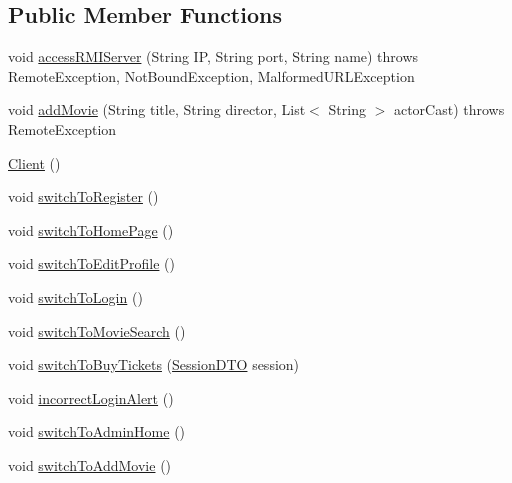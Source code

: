 \subsection*{Public Member Functions}
\begin{DoxyCompactItemize}
\item 
void \mbox{\hyperlink{classes_1_1deusto_1_1client_1_1_client_aaed61e092ef0cfa2b78065df6e6b0f55}{access\+R\+M\+I\+Server}} (String IP, String port, String name)  throws Remote\+Exception, Not\+Bound\+Exception, Malformed\+U\+R\+L\+Exception 
\item 
void \mbox{\hyperlink{classes_1_1deusto_1_1client_1_1_client_ab3ebcc9daf4719fe0c9354a49d5957e4}{add\+Movie}} (String title, String director, List$<$ String $>$ actor\+Cast)  throws Remote\+Exception 
\item 
\mbox{\hyperlink{classes_1_1deusto_1_1client_1_1_client_a71c03e318a72447da873297f3364f67f}{Client}} ()
\item 
void \mbox{\hyperlink{classes_1_1deusto_1_1client_1_1_client_a8b292db7d6ec16eaa53b224bb7a33ab4}{switch\+To\+Register}} ()
\item 
void \mbox{\hyperlink{classes_1_1deusto_1_1client_1_1_client_aff17deef622ce410b473d4dadad36343}{switch\+To\+Home\+Page}} ()
\item 
void \mbox{\hyperlink{classes_1_1deusto_1_1client_1_1_client_afefdad03c88bee0a0427af249604cf19}{switch\+To\+Edit\+Profile}} ()
\item 
void \mbox{\hyperlink{classes_1_1deusto_1_1client_1_1_client_a66fff847d9f168900f6992fd4eff5e3d}{switch\+To\+Login}} ()
\item 
void \mbox{\hyperlink{classes_1_1deusto_1_1client_1_1_client_a7cf818fce703324d74c896d9e4149dbe}{switch\+To\+Movie\+Search}} ()
\item 
void \mbox{\hyperlink{classes_1_1deusto_1_1client_1_1_client_a8ce2f6d11e690d42dbe756d10ccee160}{switch\+To\+Buy\+Tickets}} (\mbox{\hyperlink{classes_1_1deusto_1_1server_1_1data_1_1_session_d_t_o}{Session\+D\+TO}} session)
\item 
void \mbox{\hyperlink{classes_1_1deusto_1_1client_1_1_client_a8bbc4a71a4aaff50bfe419a724898790}{incorrect\+Login\+Alert}} ()
\item 
void \mbox{\hyperlink{classes_1_1deusto_1_1client_1_1_client_a3fbd67bddee7a6c6ed8466ed5b2415a7}{switch\+To\+Admin\+Home}} ()
\item 
void \mbox{\hyperlink{classes_1_1deusto_1_1client_1_1_client_ab9f0c684bccefc286261f8af7366b959}{switch\+To\+Add\+Movie}} ()
\end{DoxyCompactItemize}
